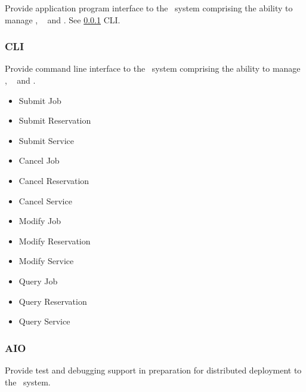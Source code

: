    Provide application program interface to the \varDUCC~system comprising the ability
    to manage \varJobs, \varReservations~ and \varServices.     
    See \ref{CLI} CLI.
    
    \subsubsection{CLI}
    \label{CLI}
    
    Provide command line interface to the \varDUCC~system comprising the ability
    to manage \varJobs, \varReservations~ and \varServices.  
    
    \begin{itemize} 
      \item{Submit Job}
      \item{Submit Reservation}
      \item{Submit Service}
      \item{Cancel Job}
      \item{Cancel Reservation}
      \item{Cancel Service}
      \item{Modify Job}
      \item{Modify Reservation}
      \item{Modify Service}
      \item{Query Job}
      \item{Query Reservation}
      \item{Query Service}
    \end{itemize}
         
    \subsubsection{AIO}
    
    Provide test and debugging support in preparation for distributed deployment to the
    \varDUCC~system.
    
